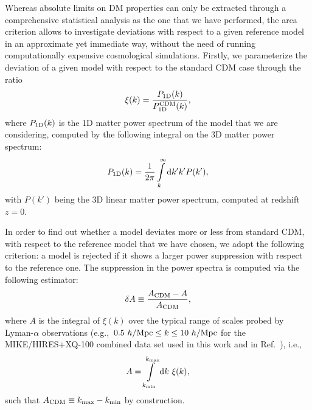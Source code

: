 \documentclass[11pt,nofootinbib]{article}
\numberwithin{equation}{section}
\begin{document}
Whereas absolute limits on DM properties can only be extracted through a comprehensive statistical analysis as the one that we have performed, the area criterion allows to investigate deviations with respect to a given reference model in an approximate yet immediate way, without the need of running computationally expensive cosmological simulations.
Firstly, we parameterize the deviation of a given model with respect to the standard CDM case through the ratio
\begin{equation}\label{eq:rk}
 \xi(k) = \frac{P_{1\rm{D}}(k)}{P^{\rm{CDM}}_{1\rm{D}}(k)},
\end{equation}
where $P_{1\rm{D}}(k)$ is the 1D matter power spectrum of the model that we are considering, computed by the following integral on the 3D matter power spectrum:
\begin{equation}\label{eq:pk1d}
 P_{1\rm{D}}(k)=\frac{1}{2\pi} \int\limits_k^\infty {\rm d}k'k'P(k'),
\end{equation}
with $P(k')$ being the 3D linear matter power spectrum, computed at redshift $z=0$.

In order to find out whether a model deviates more or less from standard CDM, with respect to the reference model that we have chosen, we adopt the following criterion: a model is rejected if it shows a larger power suppression with respect to the reference one. The suppression in the power spectra is computed via the following estimator:
\begin{equation}\label{eq:deltaA}
 \delta A \equiv \frac{A_{\rm CDM} - A}{A_{\rm CDM}},
\end{equation}
where $A$ is the integral of $\xi(k)$ over the typical range of scales probed by Lyman-$\alpha$ observations (e.g.,~$0.5~h/{\rm Mpc} \leq k \leq 10~h/{\rm Mpc}$ for the MIKE/HIRES+XQ-100 combined data set used in this work and in Ref.~\cite{Irsic:2017yje}), i.e.,
\begin{equation}\label{eq:A}
A = \int\limits_{k_{\rm min}}^{k_{\rm max}} {\rm d}k\ \xi(k),
\end{equation}
such that $A_{\rm CDM} \equiv k_{\rm max} - k_{\rm min}$ by construction.
\end{document}
